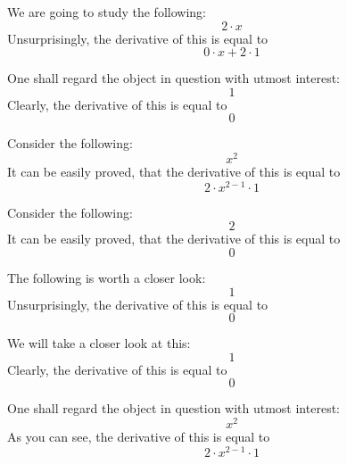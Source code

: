 \documentclass{article}
\begin{document}
We are going to study the following:
\begin{equation}
2 \cdot x 
\end{equation}
Unsurprisingly, the derivative of this is equal to
\begin{equation}
0 \cdot x + 2 \cdot 1 
\end{equation}

One shall regard the object in question with utmost interest:
\begin{equation}
1 
\end{equation}
Clearly, the derivative of this is equal to
\begin{equation}
0 
\end{equation}

Consider the following:
\begin{equation}
x ^{2 } 
\end{equation}
It can be easily proved, that the derivative of this is equal to
\begin{equation}
2 \cdot x ^{2 - 1 } \cdot 1 
\end{equation}

Consider the following:
\begin{equation}
2 
\end{equation}
It can be easily proved, that the derivative of this is equal to
\begin{equation}
0 
\end{equation}

The following is worth a closer look:
\begin{equation}
1 
\end{equation}
Unsurprisingly, the derivative of this is equal to
\begin{equation}
0 
\end{equation}

We will take a closer look at this:
\begin{equation}
1 
\end{equation}
Clearly, the derivative of this is equal to
\begin{equation}
0 
\end{equation}

One shall regard the object in question with utmost interest:
\begin{equation}
x ^{2 } 
\end{equation}
As you can see, the derivative of this is equal to
\begin{equation}
2 \cdot x ^{2 - 1 } \cdot 1 
\end{equation}
\end{document}
